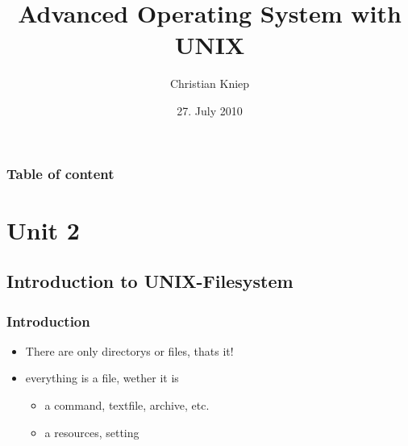 \documentclass[handout]{beamer}
\author{Christian Kniep}
\begin{document}
\title[UNIX]{Advanced Operating System with UNIX}  
\date[27.07.2010]{27. July 2010} 

\begin{frame}
	\titlepage
\end{frame} 

\begin{frame}
	\frametitle{Table of content}
	\tableofcontents
\end{frame} 


\section{Unit 2} 
	\subsection{Introduction to UNIX-Filesystem}
		\begin{frame}
			\frametitle{Introduction}
			\begin{itemize}
				\item<2-> There are only directorys or files, thats it!
                \item<3-> everything is a file, wether it is
                \begin{itemize}
                    \item<4-> a command, textfile, archive, etc.
                    \item<5-> a resources, setting
                \end{itemize}
            \end{itemize}
		\end{frame}
\end{document}
